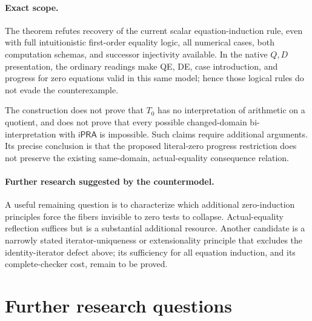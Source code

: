 \documentclass[11pt]{article}
\theoremstyle{definition}
\newcommand{\ipra}{\mathsf{iPRA}}
\begin{document}
\paragraph{Exact scope.}
The theorem refutes recovery of the current scalar equation-induction rule, even with full intuitionistic first-order equality logic, all numerical cases, both computation schemas, and successor injectivity available. In the native \(Q,D\) presentation, the ordinary readings make QE, DE, case introduction, and progress for zero equations valid in this same model; hence those logical rules do not evade the counterexample.

The construction does not prove that \(T_0\) has no interpretation of arithmetic on a quotient, and does not prove that every possible changed-domain bi-interpretation with \(\ipra\) is impossible. Such claims require additional arguments. Its precise conclusion is that the proposed literal-zero progress restriction does not preserve the existing same-domain, actual-equality consequence relation.

\paragraph{Further research suggested by the countermodel.}
A useful remaining question is to characterize which additional zero-induction principles force the fibers invisible to zero tests to collapse. Actual-equality reflection suffices but is a substantial additional resource. Another candidate is a narrowly stated iterator-uniqueness or extensionality principle that excludes the identity-iterator defect above; its sufficiency for all equation induction, and its complete-checker cost, remain to be proved.



\section{Further research questions}
\end{document}
